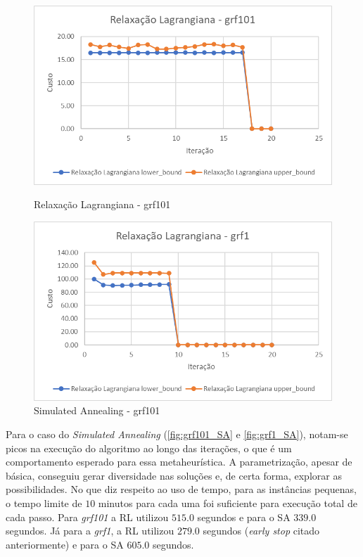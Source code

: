 \begin{figure}[H]
    \centering
    \begin{minipage}{0.48\textwidth}
        \centering
        \includegraphics[width=\linewidth]{./images/grf101_RL.png}
        \caption{Relaxação Lagrangiana - grf101}
        \label{fig:grf101_RL}
    \end{minipage}
    \hfill
    \begin{minipage}{0.48\textwidth}
        \centering
        \includegraphics[width=\linewidth]{./images/grf1_RL.png}
        \caption{Simulated Annealing - grf101}
        \label{fig:grf101_SA}
    \end{minipage}
\end{figure}

Para o caso do \emph{Simulated Annealing} (\autoref{fig:grf101_SA} e \autoref{fig:grf1_SA}), notam-se picos na execução do algoritmo ao longo das iterações, o que é um comportamento esperado para essa metaheurística. A parametrização, apesar de básica, conseguiu gerar diversidade nas soluções e, de certa forma, explorar as possibilidades. No que diz respeito ao uso de tempo, para as instâncias pequenas, o tempo limite de $10$ minutos para cada uma foi suficiente para execução total de cada passo. Para \emph{grf101} a RL utilizou $515.0$ segundos e para o SA $339.0$ segundos. Já para a \emph{grf1}, a RL utilizou $279.0$ segundos (\emph{early stop} citado anteriormente) e para o SA $605.0$ segundos.

